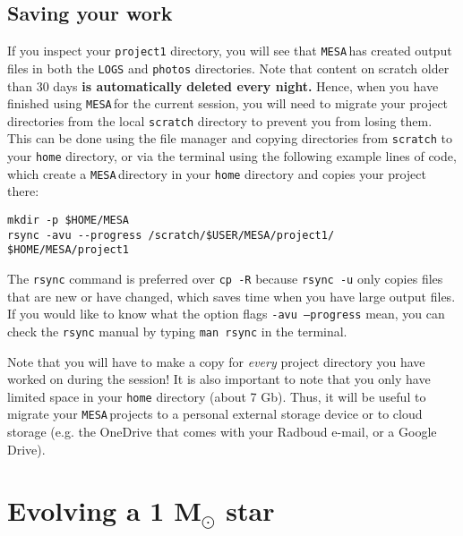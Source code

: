 \documentclass[11pt,a4paper]{article}
\newcommand{\MESA}{\texttt{MESA}\,}
\begin{document}
\subsection{Saving your work}
If you inspect your \texttt{project1} directory, you will see that \MESA has created output files in both the \texttt{LOGS} and \texttt{photos} directories.
%
Note that content on scratch older than 30 days \textbf{is automatically deleted every night.}
Hence, when you have finished using \MESA for the current session, you will need to migrate your project directories from the local \texttt{scratch} directory to prevent you from losing them. 
%
This can be done using the file manager and copying directories from \texttt{scratch} to your \texttt{home} directory, or via the terminal using the following example lines of code, which create a \MESA directory in your \texttt{home} directory and copies your project there:

\begin{lstlisting}
mkdir -p $HOME/MESA
rsync -avu --progress /scratch/$USER/MESA/project1/ $HOME/MESA/project1
\end{lstlisting}

\noindent
The \texttt{rsync} command is preferred over \texttt{cp -R} because \texttt{rsync -u} only copies files that are new or have changed, which saves time when you have large output files. If you would like to know what the option flags \texttt{-avu --progress} mean, you can check the \texttt{rsync} manual by typing \texttt{man rsync} in the terminal.

Note that you will have to make a copy for \emph{every} project directory you have worked on during the session! It is also important to note that you only have limited space in your \texttt{home} directory (about 7 Gb). Thus, it will be useful to migrate your \MESA projects to a personal external storage device or to cloud storage (e.g. the OneDrive that comes with your Radboud e-mail, or a Google Drive). 



\section{Evolving a 1 \texorpdfstring{M$_\odot$}{Msun} star}
\end{document}
